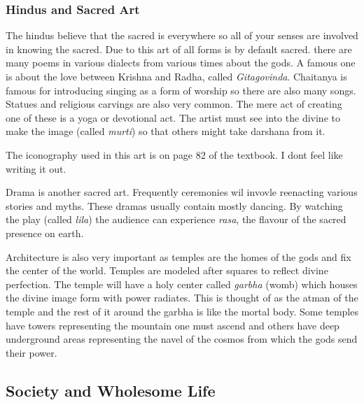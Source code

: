 \documentclass{article}
\begin{document}
\subsubsection*{Hindus and Sacred Art}
\label{ssub:hindus_and_sacred_art}
The hindus believe that the sacred is everywhere so all of your senses are involved in knowing the sacred. Due to this art of all forms is by default sacred. there are many poems in various dialects from various times about the gods. A famous one is about the love between Krishna and Radha, called \emph{Gitagovinda}. Chaitanya is famous for introducing singing as a form of worship so there are also many songs. Statues and religious carvings are also very common. The mere act of creating one of these is a yoga or devotional act. The artist must see into the divine to make the image (called \emph{murti}) so that others might take darshana from it.

The iconography used in this art is on page 82 of the textbook. I dont feel like writing it out.

Drama is another sacred art. Frequently ceremonies wil invovle reenacting various stories and myths. These dramas usually contain mostly dancing. By watching the play (called \emph{lila}) the audience can experience \emph{rasa}, the flavour of the sacred presence on earth.

Architecture is also very important as temples are the homes of the gods and fix the center of the world. Temples are modeled after squares to reflect divine perfection. The temple will have a holy center called \emph{garbha} (womb) which houses the divine image form with power radiates. This is thought of as the atman of the temple and the rest of it around the garbha is like the mortal body. Some temples have towers representing the mountain one must ascend and others have deep underground areas representing the navel of the cosmos from which the gods send their power.

\subsection*{Society and Wholesome Life}
\label{sub:society_and_wholesome_life}
\end{document}
